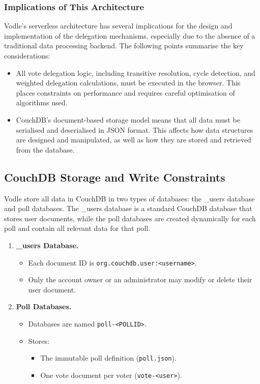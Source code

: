 \subsubsection{Implications of This Architecture}
Vodle's serverless architecture has several implications for the design and implementation of the delegation mechanisms, especially due to the absence of a traditional data processing backend. The following points summarise the key considerations:
\begin{itemize}
  \item All vote delegation logic, including transitive resolution, cycle detection, and weighted delegation calculations, must be executed in the browser. This places constraints on performance and requires careful optimisation of algorithms used.
  \item CouchDB's document-based storage model means that all data must be serialised and deserialised in JSON format. This affects how data structures are designed and manipulated, as well as how they are stored and retrieved from the database.
\end{itemize}

\subsection{CouchDB Storage and Write Constraints}
\label{subsec:couchdb_limits}

Vodle store all data in CouchDB in two types of databases: the \_users database and poll databases. The \_users database is a standard CouchDB database that stores user documents, while the poll databases are created dynamically for each poll and contain all relevant data for that poll.

\begin{enumerate}
  \item \textbf{\_users Database.}
    \begin{itemize}
      \item Each document ID is \texttt{org.couchdb.user:<username>}.
      \item Only the account owner or an administrator may modify or delete their user document.
    \end{itemize}

  \item \textbf{Poll Databases.}
    \begin{itemize}
      \item Databases are named \texttt{poll-<POLLID>}.
      \item Stores:
        \begin{itemize}
          \item The immutable poll definition (\texttt{poll.json}).
          \item One vote document per voter (\texttt{vote-<user>}).
        \end{itemize}
    \end{itemize}
\end{enumerate}

